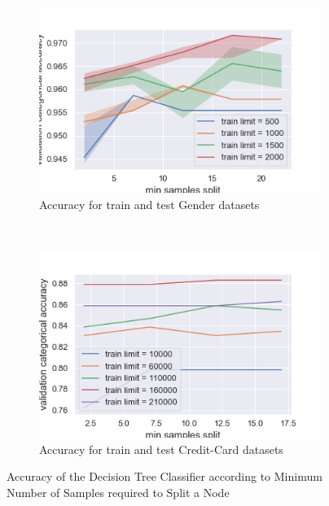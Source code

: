 \documentclass[10pt]{article}
\begin{document}
		\paragraph*{}
			\begin{figure}[h]
				\centering
				\begin{subfigure}[]{0.45\columnwidth}
					\centering
					\includegraphics[width=\linewidth]{../graphics/tree_gender_min_samples_split_score_type_train_limit.png}
					\caption{Accuracy for train and test Gender datasets}
					\label{tree:tree_gender_min_samples_split_score_type_train_limit}
				\end{subfigure}
				~
				\begin{subfigure}[]{0.45\columnwidth}
					\centering
					\includegraphics[width=\linewidth]{../graphics/tree_creditcard_min_samples_split_score_type_train_limit.png}
					\caption{Accuracy for train and test Credit-Card datasets}
					\label{tree:tree_creditcard_min_samples_split_score_type_train_limit}
				\end{subfigure}
				\caption{Accuracy of the Decision Tree Classifier according to Minimum Number of Samples required to Split a Node}
				\label{tree:min_samples_split_score_type_score_type}
			\end{figure}
\end{document}
